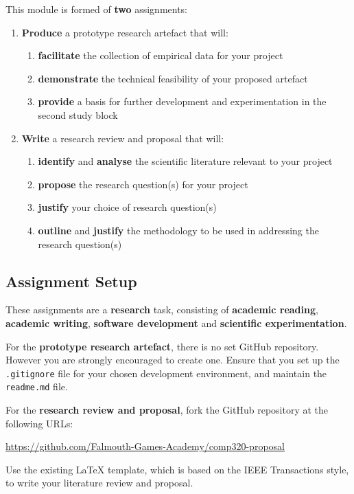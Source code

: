 \documentclass{../fal_assignment}
\begin{document}
This module is formed of \textbf{two} assignments:
\begin{enumerate}
	\item \textbf{Produce} a prototype research artefact that will:
		\begin{enumerate}[label=(\roman*)]
			\item \textbf{facilitate} the collection of empirical data for your project
			\item \textbf{demonstrate} the technical feasibility of your proposed artefact
			\item \textbf{provide} a basis for further development and experimentation in the second study block
		\end{enumerate}
	\item \textbf{Write} a research review and proposal that will:
		\begin{enumerate}[label=(\roman*)]
			\item \textbf{identify} and \textbf{analyse} the scientific literature relevant to your project
			\item \textbf{propose} the research question(s) for your project
			\item \textbf{justify} your choice of research question(s)
			\item \textbf{outline} and \textbf{justify} the methodology to be used in addressing the research question(s)
		\end{enumerate}
\end{enumerate}

\subsection*{Assignment Setup}

These assignments are a \textbf{research} task, consisting of \textbf{academic reading}, \textbf{academic writing},
\textbf{software development} and \textbf{scientific experimentation}.

For the \textbf{prototype research artefact}, there is no set GitHub repository.
However you are strongly encouraged to create one.
Ensure that you set up the \texttt{.gitignore} file for your chosen development environment,
and maintain the \texttt{readme.md} file.

For the \textbf{research review and proposal}, fork the GitHub repository at the following URLs:

\indent \url{https://github.com/Falmouth-Games-Academy/comp320-proposal}

Use the existing LaTeX template, which is based on the IEEE Transactions style,
to write your literature review and proposal.
\end{document}
